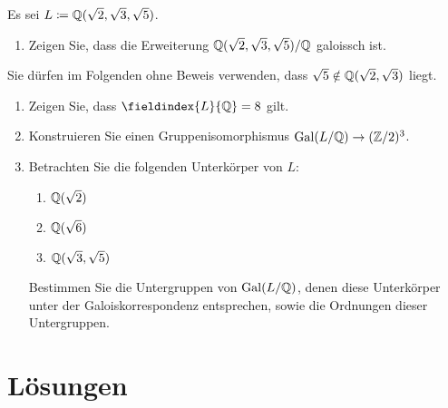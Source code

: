 \documentclass[a4paper, 10pt]{scrartcl}
\begin{document}
\begin{question}
  Es sei $L \coloneqq \mathbb{Q}(\sqrt{2}, \sqrt{3}, \sqrt{5})$.
  \begin{enumerate}
    \item
      Zeigen Sie, dass die Erweiterung $\mathbb{Q}(\sqrt{2}, \sqrt{3}, \sqrt{5})/\mathbb{Q}$ galoissch ist.
  \end{enumerate}
  Sie dürfen im Folgenden ohne Beweis verwenden, dass $\sqrt{5} \notin \mathbb{Q}(\sqrt{2}, \sqrt{3})$ liegt.
  \begin{enumerate}[resume]
    \item
      Zeigen Sie, dass $\fieldindex{L}{\Rational} = 8$ gilt.
    \item
      Konstruieren Sie einen Gruppenisomorphismus $\operatorname{Gal}(L/\mathbb{Q}) \to (\mathbb{Z}/2)^3$.
    \item
      Betrachten Sie die folgenden Unterkörper von $L$:
      \begin{enumerate}
        \item
          $\mathbb{Q}(\sqrt{2})$
        \item
          $\mathbb{Q}(\sqrt{6})$
        \item
          $\mathbb{Q}(\sqrt{3}, \sqrt{5})$
      \end{enumerate}
      Bestimmen Sie die Untergruppen von $\operatorname{Gal}(L/\mathbb{Q})$, denen diese Unterkörper unter der Galoiskorrespondenz entsprechen, sowie die Ordnungen dieser Untergruppen.
  \end{enumerate}
\end{question}





\pagebreak





\section*{Lösungen}

\printsolutions
\end{document}
